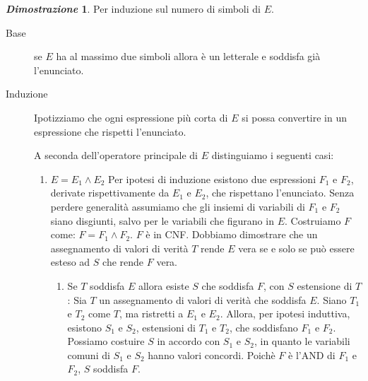 \documentclass[12pt]{article}
\theoremstyle{definition}
\newtheorem*{myproof}{\em Dimostrazione}
\begin{document}
\begin{myproof}
  Per induzione sul numero di simboli di \(E\).

  \begin{description}

    \item[Base] se \(E\) ha al massimo due simboli allora \`e un letterale e soddisfa gi\`a l'enunciato. \newline

    \item[Induzione] Ipotizziamo che ogni espressione pi\`u corta di \(E\) si possa convertire in un espressione
      che rispetti l'enunciato.\newline

      A seconda dell'operatore principale di \(E\) distinguiamo i seguenti casi:\newline

      \begin{enumerate}
        \item \(E = E_1 \land E_2\) Per ipotesi di induzione esistono due espressioni \(F_1\) e \(F_2\),
          derivate rispettivamente da \(E_1\) e \(E_2\), che rispettano l'enunciato.\newline
          Senza perdere generalit\`a assumiamo che gli insiemi di variabili di \(F_1\) e \(F_2\)
          siano disgiunti, salvo per le variabili che figurano in \(E\). \newline
          Costruiamo \(F\) come: \(F = F_1 \land F_2\).\newline
          \(F\) \`e in CNF. Dobbiamo dimostrare che un assegnamento di valori di verit\`a \(T\) rende \(E\) vera
          se e solo se pu\`o essere esteso ad \(S\) che rende \(F\) vera.\newline

          \begin{enumerate}

            \item Se \(T\) soddisfa \(E\) allora esiste \(S\) che soddisfa \(F\), con \(S\) estensione di \(T\):\newline
              Sia \(T\) un assegnamento di valori di verit\`a che soddisfa \(E\). Siano \(T_1\) e \(T_2\) come \(T\),
              ma ristretti a \(E_1\) e \(E_2\).\newline
              Allora, per ipotesi induttiva, esistono \(S_1\) e \(S_2\), estensioni di \(T_1\) e \(T_2\), che soddisfano \(F_1\) e \(F_2\).\newline
              Possiamo costuire \(S\) in accordo con \(S_1\) e \(S_2\), in quanto le variabili comuni di \(S_1\) e \(S_2\) hanno valori concordi.
              Poich\`e \(F\) \`e l'AND di \(F_1\) e \(F_2\), \(S\) soddisfa \(F\).\newline


\end{enumerate}
\end{enumerate}
\end{description}
\end{myproof}
\end{document}
